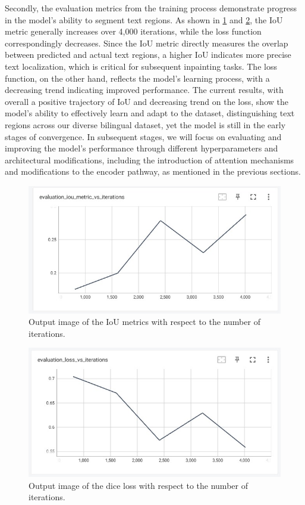 \documentclass[10pt,twocolumn,letterpaper]{article}
\begin{document}
Secondly, the evaluation metrics from the training process demonstrate progress in the model's ability to segment text regions. 
As shown in \cref{fig:out_iou} and \cref{fig:out_loss}, the IoU metric generally increases over 4,000 iterations, while the loss function correspondingly decreases. 
Since the IoU metric directly measures the overlap between predicted and actual text regions, a higher IoU indicates more precise text localization, 
which is critical for subsequent inpainting tasks. The loss function, on the other hand, reflects the model's learning process, with a decreasing trend indicating improved performance.
The current results, with overall a positive trajectory of IoU and decreasing trend on the loss, show the model's ability to effectively learn and adapt to the dataset, distinguishing 
text regions across our diverse bilingual dataset, yet the model is still in the early stages of convergence. In subsequent stages, we will focus on evaluating and improving the model's 
performance through different hyperparameters and architectural modifications, including the introduction of attention mechanisms and  modifications to the encoder pathway, as 
mentioned in the previous sections.

\begin{figure}[t]
    \centering
    \includegraphics[width=\linewidth]{figures/milestone/out_iou.jpg}
    \caption{Output image of the IoU metrics with respect to the number of iterations. }
    \label{fig:out_iou}
\end{figure}

\begin{figure}[t]
    \centering
    \includegraphics[width=\linewidth]{figures/milestone/out_loss.jpg}
    \caption{Output image of the dice loss with respect to the number of iterations. }
    \label{fig:out_loss}
\end{figure}
\end{document}
